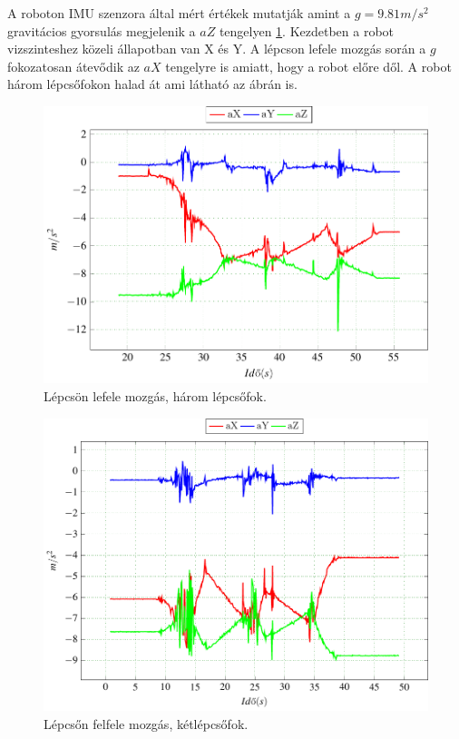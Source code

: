 A roboton IMU szenzora által mért értékek mutatják amint a $g=9.81 m/s^2$ gravitácios gyorsulás megjelenik a $aZ$ tengelyen \ref{fig:ImuLepcsoLe1}. Kezdetben a robot vizszinteshez közeli állapotban van X és Y.  A lépcson lefele mozgás során a $g$ fokozatosan átevődik az $aX$ tengelyre is amiatt, hogy a robot előre dől. A robot három lépcsőfokon halad át ami látható az ábrán is.

\begin{figure}[H]
  \begin{center}
  	\includegraphics[scale=0.9]{tikz/ImuLepcsoLe1.pdf}
  \end{center}
  \caption{Lépcsön lefele mozgás, három lépcsőfok.}
  \label{fig:ImuLepcsoLe1}
\end{figure}

\begin{figure}[H]
  \begin{center}
  	\includegraphics[scale=0.8]{tikz/ImuLepcsoFel1.pdf}
  \end{center}
  \caption{Lépcsőn felfele mozgás, kétlépcsőfok.}
  \label{fig:ImuLepcsoFel1}
\end{figure}

